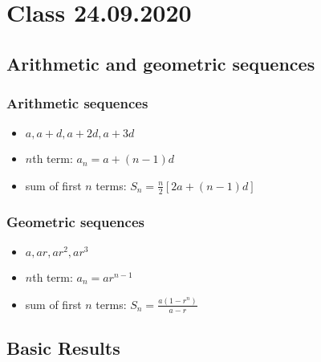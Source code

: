 \documentclass[../00_main.tex]{subfiles}
\begin{document}
\section{Class 24.09.2020}

\subsection{Arithmetic and geometric sequences}

\subsubsection{Arithmetic sequences}

\begin{itemize}
    \item $a, a+d, a+2d, a+3d$
    \item $n$th term: $a_n = a + (n-1)d$
    \item sum of first $n$ terms: $S_n = \frac{n}{2}\left[ 2a + (n-1)d\right]$
\end{itemize}

\subsubsection{Geometric sequences}

\begin{itemize}
    \item $a, ar, ar^2, ar^3$
    \item $n$th term: $a_n = ar^{n-1}$
    \item sum of first $n$ terms: $S_n = \frac{a(1-r^n)}{a-r}$
\end{itemize}

\subsection{Basic Results}
\end{document}
